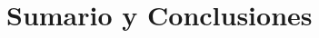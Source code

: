 \documentclass[a4paper,slidestop,xcolor=pst,blue]{beamer}
\begin{document}
%
%
%
%
%


%

\section{Sumario y Conclusiones}
\end{document}
